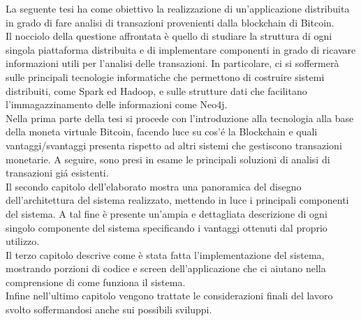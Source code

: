 \documentclass[a4paper, 
				11pt,
				stile=classica,
				tipotesi=triennale]{toptesi}
\makeatletter
\newcommand\listofcodes{%
 \iffrontmatter\else\frontmattertrue\fi
 \if@openright\cleardoublepage\else\clearpage\fi
 \begingroup\def\chapter##1{\@schapter}
 \phantomsection %
 \lstlistoflistings 
 \endgroup
}
\makeatother
\begin{document}

\sommario
La seguente tesi ha come obiettivo la realizzazione di un'applicazione distribuita in grado di fare analisi di transazioni provenienti dalla blockchain di Bitcoin.\\Il nocciolo della questione affrontata è quello di studiare la struttura di ogni singola piattaforma distribuita e di implementare componenti in grado di ricavare informazioni utili per l'analisi delle transazioni. In particolare, ci si soffermerà sulle principali tecnologie informatiche che permettono di costruire sistemi distribuiti, come Spark ed Hadoop, e sulle strutture dati che facilitano l'immagazzinamento delle informazioni come Neo4j.
\\Nella prima parte della tesi si procede con l'introduzione alla tecnologia alla base della moneta virtuale Bitcoin, facendo luce su cos’\'e la Blockchain e quali vantaggi/svantaggi presenta rispetto ad altri sistemi che gestiscono transazioni monetarie. A seguire, sono presi in esame le principali soluzioni di analisi di transazioni gi\'a esistenti. 
\\Il secondo capitolo dell'elaborato mostra una panoramica del disegno dell’architettura del sistema realizzato, mettendo in luce i principali componenti del sistema. A tal fine è presente un'ampia e dettagliata descrizione di ogni singolo componente del sistema specificando i vantaggi ottenuti dal proprio utilizzo.
\\Il terzo capitolo descrive come è stata fatta l'implementazione del sistema, mostrando porzioni di codice e screen dell'applicazione che ci aiutano nella comprensione di come funziona il sistema.
\\Infine nell'ultimo capitolo vengono trattate le considerazioni finali del lavoro svolto soffermandosi anche sui possibili sviluppi. 




\tableofcontents

\listoffigures

\listoftables


\listofcodes
{}

\mainmatter
\setcounter{secnumdepth}{4}






%



\nocite{*}
\printbibliography
{}
\end{document}
